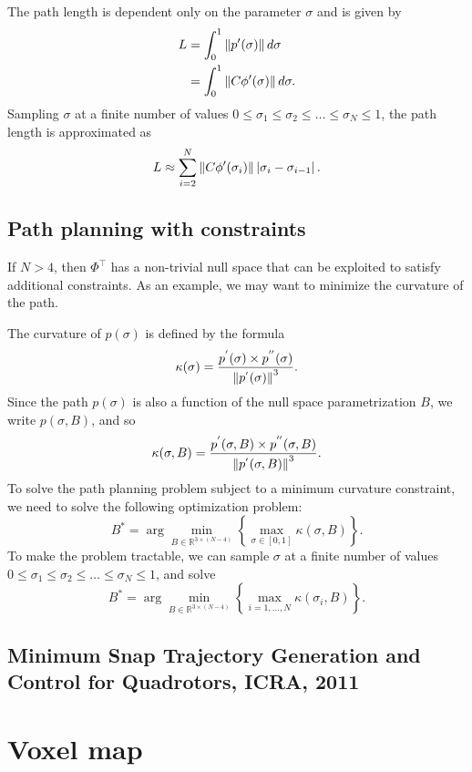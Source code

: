The path length is dependent only on the parameter $\sigma$ and is given by
\begin{align*}
L &= \int_0^1 \left\|p'(\sigma)\right\|d\sigma \\
  &= \int_0^1 \left\|C\phi'(\sigma)\right\|d\sigma.
\end{align*}
Sampling $\sigma$ at a finite number of values $0\leq\sigma_1\leq\sigma_2\leq\dots\leq\sigma_N\leq 1$, the path length is approximated as
\[
L \approx \sum_{i=2}^N \left\|C\phi'(\sigma_i)\right\|\left|\sigma_i-\sigma_{i-1}\right|.
\]

    


\subsection{Path planning with constraints}


If $N>4$, then $\Phi^\top$ has a non-trivial null space that can be exploited to satisfy additional constraints.  As an example, we may want to minimize the curvature of the path.  

The curvature of $p(\sigma)$ is defined by the formula
\[
\kappa(\sigma) = \frac{p^{'}(\sigma)\times p^{''}(\sigma)}{\left\|p^{'}(\sigma)\right\|^3}.
\]
Since the path $p(\sigma)$ is also a function of the null space parametrization $B$, we write $p(\sigma, B)$, and so
\[
\kappa(\sigma, B) = \frac{p^{'}(\sigma, B)\times p^{''}(\sigma, B)}{\left\|p^{'}(\sigma, B)\right\|^3}.
\]
To solve the path planning problem subject to a minimum curvature constraint, we need to solve the following optimization problem:
\[
B^\ast = \arg\min_{B\in\mathbb{R}^{3\times(N-4)}} \left\{ \max_{\sigma\in[0,1]}\kappa(\sigma, B)\right\}.
\]
To make the problem tractable, we can sample $\sigma$ at a finite number of values $0\leq\sigma_1\leq\sigma_2\leq\dots\leq\sigma_N\leq 1$, and solve
\[
B^\ast = \arg\min_{B\in\mathbb{R}^{3\times(N-4)}} \left\{ \max_{i=1,\dots,N}\kappa(\sigma_i, B)\right\}.
\]

\subsection{Minimum Snap Trajectory Generation and Control for Quadrotors, ICRA, 2011}



\section{Voxel map}

